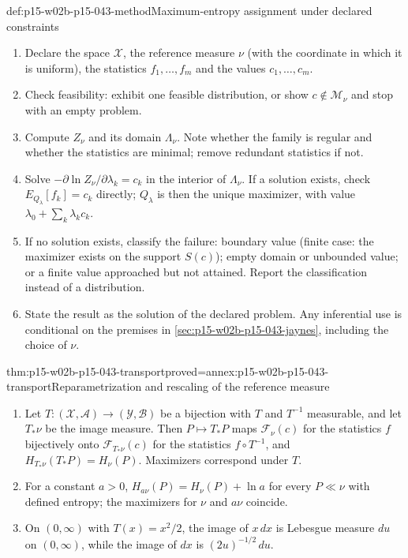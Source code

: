 \begin{hbmethod}{def:p15-w02b-p15-043-method}{Maximum-entropy assignment under declared constraints}
\begin{enumerate}
\item Declare the space \(\mathcal X\), the reference measure \(\nu\)
(with the coordinate in which it is uniform), the statistics
\(f_1,\ldots,f_m\) and the values \(c_1,\ldots,c_m\).
\item Check feasibility: exhibit one feasible distribution, or show
\(c\notin\mathcal M_\nu\) and stop with an empty problem.
\item Compute \(Z_\nu\) and its domain \(\Lambda_\nu\). Note whether the
family is regular and whether the statistics are minimal; remove redundant
statistics if not.
\item Solve \(-\partial\ln Z_\nu/\partial\lambda_k=c_k\) in the interior of
\(\Lambda_\nu\). If a solution exists, check \(E_{Q_\lambda}[f_k]=c_k\)
directly; \(Q_\lambda\) is then the unique maximizer, with value
\(\lambda_0+\sum_k\lambda_kc_k\).
\item If no solution exists, classify the failure: boundary value
(finite case: the maximizer exists on the support \(S(c)\)); empty
domain or unbounded value; or a finite value approached but not attained.
Report the classification instead of a distribution.
\item State the result as the solution of the declared problem. Any
inferential use is conditional on the premises in
\cref{sec:p15-w02b-p15-043-jaynes}, including the choice of \(\nu\).
\end{enumerate}
\end{hbmethod}

\begin{hbtheorem}{thm:p15-w02b-p15-043-transport}{proved=annex:p15-w02b-p15-043-transport}{Reparametrization and rescaling of the reference measure}
\begin{enumerate}
\item Let \(T:(\mathcal X,\mathcal A)\to(\mathcal Y,\mathcal B)\) be a
bijection with \(T\) and \(T^{-1}\) measurable, and let \(T_*\nu\) be the
image measure. Then \(P\mapsto T_*P\) maps \(\mathcal F_\nu(c)\) for the
statistics \(f\) bijectively onto \(\mathcal F_{T_*\nu}(c)\) for the
statistics \(f\circ T^{-1}\), and \(H_{T_*\nu}(T_*P)=H_\nu(P)\). Maximizers
correspond under \(T\).
\item For a constant \(a>0\), \(H_{a\nu}(P)=H_\nu(P)+\ln a\) for every
\(P\ll\nu\) with defined entropy; the maximizers for \(\nu\) and
\(a\nu\) coincide.
\item On \((0,\infty)\) with \(T(x)=x^2/2\), the image of \(x\,dx\) is
Lebesgue measure \(du\) on \((0,\infty)\), while the image of \(dx\) is
\((2u)^{-1/2}\,du\).
\end{enumerate}
\end{hbtheorem}

